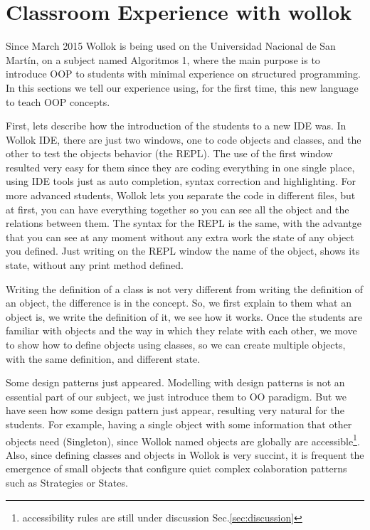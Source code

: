 \section{Classroom Experience with wollok}
\label{experience}

Since March 2015 Wollok is being used on the Universidad Nacional de San Martín, on a subject named Algoritmos 1, 
where the main purpose is to introduce OOP to students with minimal experience on structured programming.
In this sections we tell our experience using, for the first time, this new language to teach OOP concepts.

First, lets describe how the introduction of the students to a new IDE was. 
In Wollok IDE, there are just two windows, one to code objects and classes, and the other to test the objects behavior (the REPL). 
The use of the first window resulted very easy for them since they are coding everything in one single place, using IDE tools just as auto completion, syntax correction and highlighting. 
For more advanced students, Wollok lets you separate the code in different files, but at first, you can have everything together so you can see all the object and the relations between them.
The syntax for the REPL is the same, with the advantge that you can see at any moment without any extra work the state of any object you defined. 
Just writing on the REPL window the name of the object, shows its state, without any print method defined.

Writing the definition of a class is not very different from writing the definition of an object, the difference is in the concept. 
So, we first explain to them what an object is, we write the definition of it, we see how it works. 
Once the students are familiar with objects and the way in which they relate with each other, we move to show how to define objects using classes, so we can create multiple objects, with the same definition, and different state.

Some design patterns just appeared. 
Modelling with design patterns is not an essential part of our subject, we just introduce them to OO paradigm. 
But we have seen how some design pattern just appear, resulting very natural for the students. 
For example, having a single object with some information that other objects need (Singleton), 
since Wollok named objects are globally are accessible\footnote{accessibility rules are still under discussion \cf Sec.\ref{sec:discussion}}. 
Also, since defining classes and objects in Wollok is very succint, it is frequent the emergence of small objects that configure quiet complex colaboration patterns such as Strategies or States\cite{Gamm93b}.



